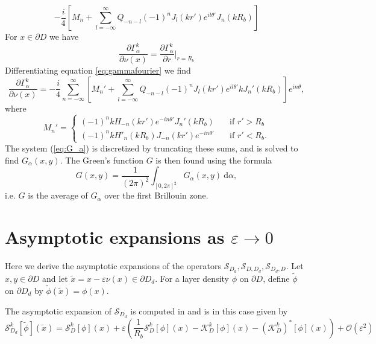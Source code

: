 \documentclass[a4paper]{article}
\theoremstyle{definition}
\renewcommand{\S}{\mathcal{S}}
\newcommand{\K}{\mathcal{K}}
\renewcommand{\O}{\mathcal{O}}
\renewcommand{\epsilon}{\varepsilon}
\newcommand{\dx}{\: \mathrm{d}}
\newcommand{\eqnref}[1]{(\ref {#1})}
\begin{document}
\begin{equation*}
-\frac{i}{4}\left[M_n + \sum_{l=-\infty}^\infty Q_{-n-l} (-1)^nJ_l(kr')e^{il\theta'}J_n(kR_b)\right]
\end{equation*}
For $x\in \partial D$ we have
\begin{equation*}
\frac{\partial \Gamma_\alpha^k}{\partial \nu(x)} = \frac{\partial \Gamma_\alpha^k}{\partial r} \Bigg|_{r=R_b}
\end{equation*} 
Differentiating equation \ref{eq:gammafourier} we find
\begin{equation*}
\frac{\partial \Gamma_\alpha^k}{\partial \nu(x)} = -\frac{i}{4}\sum_{n=-\infty}^\infty\left[ M_n' + \sum_{l=-\infty}^\infty Q_{-n-l} (-1)^nJ_l(kr')e^{il\theta'}kJ_n'(kR_b)\right]e^{in\theta},
\end{equation*}
where
\begin{equation*}
M_n' = \begin{cases}
(-1)^nkH_{-n}(kr')e^{-in\theta'}J_n'(kR_b) \quad &\text{if } r' > R_b \\
(-1)^nkH'_{n}(kR_b)J_{-n}(kr')e^{-in\theta'} \quad &\text{if } r' < R_b.
\end{cases}
\end{equation*}
The system \eqnref{eq:G_a} is discretized by truncating these sums, and is solved to find $G_\alpha(x,y)$. The Green's function $G$ is then found using the formula
\begin{equation*}
G(x,y) = \frac{1}{(2\pi)^2}\int_{[0,2\pi]^2} G_\alpha(x,y) \dx \alpha,
\end{equation*}
i.e. $G$ is the average of $G_\alpha$ over the first Brillouin zone. 

\section{Asymptotic expansions as $\epsilon \rightarrow 0$}
Here we derive the asymptotic expansions of the operators $\S_{D_d}, \S_{D,D_d}, \S_{D_d,D}$. Let $x,y\in \partial D$ and let $\tilde{x} = x - \epsilon \nu(x) \in \partial D_d$. For a layer density $\phi$ on $\partial D$, define $\tilde{\phi}$ on $\partial D_d$ by $\tilde{\phi}(\tilde{x}) = \phi (x)$.

The asymptotic expansion of $\S_{D_d}$ is computed in \cite{lecturenotes} and is in this case given by
\begin{equation*}
\S_{D_d}^k[\tilde{\phi}](\tilde{x}) = \S_D^k[\phi](x) +\epsilon \left(\frac{1}{R_b}\S_D^k[\phi](x) - \K_D^k[\phi](x) - \left(\K_D^k\right)^*[\phi](x)\right) + \O(\epsilon^2)
\end{equation*}
\end{document}
